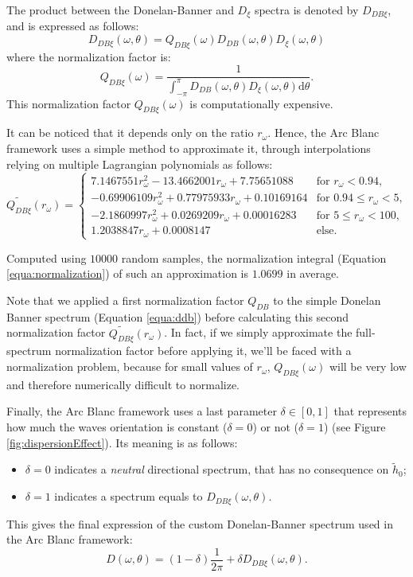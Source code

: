 \documentclass[final]{jcgt}
\def\framework{the Arc Blanc framework\xspace}
\begin{document}
The product between the Donelan-Banner and $D_{\xi}$ spectra is denoted by $D_{DB\xi}$, and is expressed as follows:
\begin{equation}
	D_{DB\xi}(\omega, \theta) =Q_{DB\xi}(\omega) D_{DB}(\omega, \theta) D_{\xi}(\omega, \theta)
\end{equation}
where the normalization factor is:
\begin{equation}
	Q_{DB\xi}(\omega)=\frac{1}{\displaystyle\int_{-\pi}^\pi D_{DB}(\omega, \theta) D_{\xi}(\omega, \theta) \mathrm{d} \theta}.
\end{equation}
This normalization factor $Q_{DB\xi}(\omega)$ is computationally expensive.

It can be noticed that it depends only on the ratio $r_{\omega}$.
Hence, \framework uses a simple method to approximate it, through interpolations relying on multiple Lagrangian polynomials as follows:
\begin{equation}
	\widetilde{Q_{DB\xi}}(r_{\omega})=
	\begin{cases}
		7.1467551 r_{\omega}^2 - 13.4662001 r_{\omega} + 7.75651088    & \text{for }r_{\omega} < 0.94,        \\
		- 0.69906109 r_{\omega}^2 + 0.77975933 r_{\omega} + 0.10169164 & \text{for }0.94 \leq r_{\omega} < 5, \\
		- 2.1860997 r_{\omega}^2 +0.0269209 r_{\omega} +0.00016283     & \text{for } 5 \leq r_{\omega} < 100, \\
		1.2038847 r_{\omega} + 0.0008147                               & \text{else.}
	\end{cases}
\end{equation}

Computed using $10000$ random samples, the normalization integral (Equation \ref{equa:normalization}) of such an approximation is $1.0699$ in average.

Note that we applied a first normalization factor $Q_{DB}$ to the simple Donelan Banner spectrum (Equation \ref{equa:ddb}) before calculating this second normalization factor $\widetilde{Q_{DB\xi}}(r_{\omega})$. In fact, if we simply approximate the full-spectrum normalization factor before applying it, we'll be faced with a normalization problem, because for small values of $r_{\omega}$, $Q_{DB\xi}(\omega)$ will be very low and therefore numerically difficult to normalize.

Finally, \framework uses a last parameter $\delta\in[0,1]$ that represents how much the waves orientation is constant ($\delta = 0$) or not ($\delta = 1$) (see Figure \ref{fig:dispersionEffect}).
Its meaning is as follows:
\begin{itemize}
	\item $\delta = 0$ indicates a \emph{neutral} directional spectrum, that has no consequence on $\tilde{h}_0$;
	\item $\delta=1$ indicates a spectrum equals to $D_{DB\xi}(\omega, \theta)$.
\end{itemize}
This gives the final expression of the custom Donelan-Banner spectrum used in \framework:
\begin{equation}
	D(\omega, \theta)=\left(1-\delta\right)\frac{1}{2\pi}+\delta D_{DB\xi}(\omega,\theta).
\end{equation}
\end{document}
